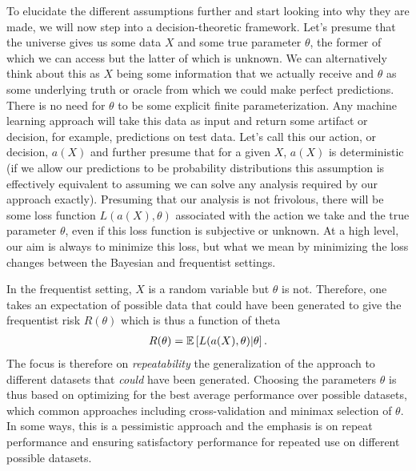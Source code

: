 To elucidate the
different assumptions further and start looking into why they are made, we will now step into a decision-theoretic
framework.  Let's presume that the universe gives us some data $X$ and some true parameter $\theta$, the former of which
we can access but the latter of which is unknown.  We can alternatively think about this as $X$ being some information
that we actually receive and $\theta$ as some underlying truth or oracle from which we could make perfect predictions.  There is
no need for $\theta$ to be some explicit finite parameterization.  Any machine learning approach will take this data as input and
return some artifact or decision, for example, predictions on test data.  Let's call this our action, or decision, $a(X)$
and further presume that for a given $X$, $a(X)$ is deterministic (if we allow our predictions to be probability
distributions this assumption is effectively equivalent to assuming we can solve any analysis required by our approach exactly).
Presuming that our analysis is not frivolous, there will be some loss function $L(a(X),\theta)$ associated with the action we take
and the true parameter $\theta$, even if this loss function is subjective or unknown.  At a high level, our aim is always to
minimize this loss, but what we mean by minimizing the loss changes between the Bayesian and frequentist settings.  

In the
frequentist setting, $X$ is a random variable but $\theta$ is not.  Therefore, one takes an expectation of possible data
that could have been generated to give the frequentist risk $R(\theta)$ which is thus a function of theta~\cite{vapnik1998statistical}
\begin{align}
\label{eq:bayes:freq-risk}
R(\theta)  = \mathbb{E}\left[L(a(X),\theta) | \theta \right].
\end{align}
The focus is therefore on \emph{repeatability}
the generalization of the approach to different datasets that \emph{could} have been generated.
Choosing the parameters $\theta$ is thus based on optimizing for the best average performance over possible datasets,
which common approaches including cross-validation and minimax selection of $\theta$.  In some ways, this is a pessimistic
approach and the emphasis is on repeat performance and ensuring satisfactory performance for repeated use on different possible
datasets.  

